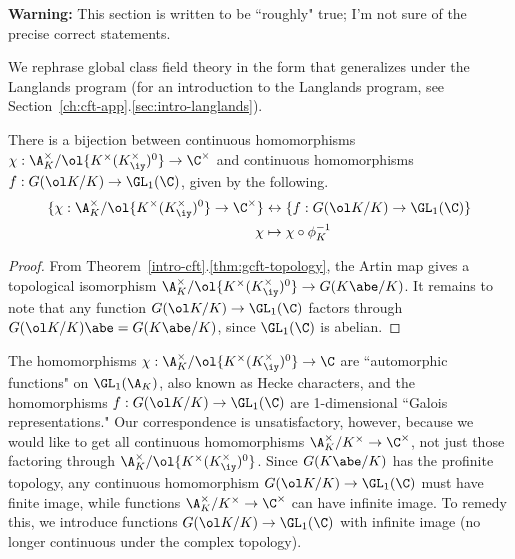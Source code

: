 \textbf{Warning:} This section is written to be ``roughly" true; I'm not sure of the precise correct statements.

We rephrase global class field theory in the form that generalizes under the Langlands program (for an introduction to the Langlands program, see Section~\ref{ch:cft-app}.\ref{sec:intro-langlands}).
\begin{thm}
There is a bijection between continuous homomorphisms $\chi:\A_K^{\times}/\ol{K^{\times}(K^{\times}_{\iy})^0}\to \C^{\times}$ and continuous homomorphisms $f:G(\ol K/K)\to \GL_1(\C)$, given by the following.
\begin{align*}
\{
\chi:\A_K^{\times}/\ol{K^{\times}(K^{\times}_{\iy})^0}\to \C^{\times}
\}
&\leftrightarrow
\{f:G(\ol K/K)\to \GL_1(\C)\} \\
\chi&\mapsto \chi\circ \phi_K^{-1}
\end{align*}
\end{thm}
\begin{proof}
From Theorem~\ref{intro-cft}.\ref{thm:gcft-topology}, the Artin map gives a topological isomorphism $ \A_K^{\times}/\ol{K^{\times}(K^{\times}_{\iy})^0}\to G(K\abe/K)$. It remains to note that any function $G(\ol K/K)\to \GL_1(\C)$ factors through $G(\ol K/K)\abe=G(K\abe/K)$, since $\GL_1(\C)$ is abelian.
\end{proof}
The homomorphisms $\chi:\A_K^{\times}/\ol{K^{\times}(K^{\times}_{\iy})^0}\to \C$ are ``automorphic functions" on $\GL_1(\A_K)$, also known as Hecke characters, and the homomorphisms $f:G(\ol K/K)\to \GL_1(\C)$ are 1-dimensional ``Galois representations." Our correspondence is unsatisfactory, however, because we would like to get all continuous homomorphisms $\A_K^{\times}/K^{\times}\to \C^{\times}$, not just those factoring through $\A_K^{\times}/\ol{K^{\times}(K^{\times}_{\iy})^0}$. Since $G(K\abe/K)$ has the profinite topology, %
any continuous homomorphism $G(\ol K/K)\to \GL_1(\C)$ must have finite image, while functions $\A_K^{\times}/K^{\times}\to \C^{\times}$ can have infinite image. To remedy this, we introduce functions $G(\ol K/K)\to \GL_1(\C)$ with infinite image (no longer continuous under the complex topology). 
